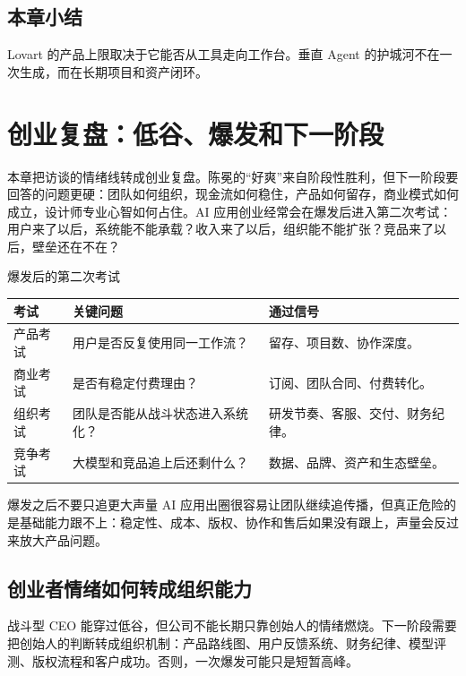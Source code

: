 \documentclass[a4paper]{article}
\begin{document}
\subsection{本章小结}

Lovart 的产品上限取决于它能否从工具走向工作台。垂直 Agent 的护城河不在一次生成，而在长期项目和资产闭环。

\section{创业复盘：低谷、爆发和下一阶段}

本章把访谈的情绪线转成创业复盘。陈冕的“好爽”来自阶段性胜利，但下一阶段要回答的问题更硬：团队如何组织，现金流如何稳住，产品如何留存，商业模式如何成立，设计师专业心智如何占住。AI 应用创业经常会在爆发后进入第二次考试：用户来了以后，系统能不能承载？收入来了以后，组织能不能扩张？竞品来了以后，壁垒还在不在？

\begin{knowledgebox}{爆发后的第二次考试}
\begin{tabularx}{\textwidth}{p{}p{}X}
\toprule
考试 & 关键问题 & 通过信号 \\
\midrule
产品考试 & 用户是否反复使用同一工作流？ & 留存、项目数、协作深度。 \\
商业考试 & 是否有稳定付费理由？ & 订阅、团队合同、付费转化。 \\
组织考试 & 团队是否能从战斗状态进入系统化？ & 研发节奏、客服、交付、财务纪律。 \\
竞争考试 & 大模型和竞品追上后还剩什么？ & 数据、品牌、资产和生态壁垒。 \\
\bottomrule
\end{tabularx}
\end{knowledgebox}

\begin{warningbox}{爆发之后不要只追更大声量}
AI 应用出圈很容易让团队继续追传播，但真正危险的是基础能力跟不上：稳定性、成本、版权、协作和售后如果没有跟上，声量会反过来放大产品问题。
\end{warningbox}

\subsection{创业者情绪如何转成组织能力}

战斗型 CEO 能穿过低谷，但公司不能长期只靠创始人的情绪燃烧。下一阶段需要把创始人的判断转成组织机制：产品路线图、用户反馈系统、财务纪律、模型评测、版权流程和客户成功。否则，一次爆发可能只是短暂高峰。
\end{document}
